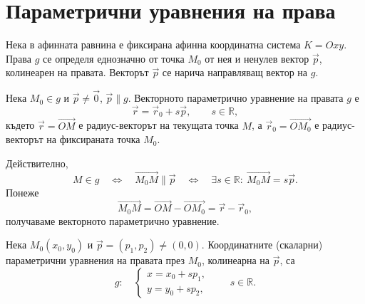 \begin{konspekt}
\end{konspekt}

\section{Параметрични уравнения на права}\label{s:28.1}

Нека в афинната равнина е фиксирана афинна координатна система
$K=Oxy$. Права $g$ се определя еднозначно от точка $M_0$ от нея и
ненулев вектор $\vec p$, колинеарен на правата. Векторът $\vec p$ се
нарича направляващ вектор на $g$.

\begin{defn}
Нека $M_0\in g$ и $\vec p\neq\vec 0$, $\vec p\parallel g$. Векторното
параметрично уравнение на правата $g$ е
\[
 \vec r=\vec r_0+s\vec p,\qquad s\in\mathbb R,
\]
където $\vec r=\overrightarrow{OM}$ е радиус-векторът на текущата точка
$M$, а $\vec r_0=\overrightarrow{OM_0}$ е радиус-векторът на фиксираната
точка $M_0$.
\end{defn}

Действително,
\[
 M\in g
 \quad\Longleftrightarrow\quad
 \overrightarrow{M_0M}\parallel\vec p
 \quad\Longleftrightarrow\quad
 \exists s\in\mathbb R:\ \overrightarrow{M_0M}=s\vec p.
\]
Понеже
\[
 \overrightarrow{M_0M}
 =\overrightarrow{OM}-\overrightarrow{OM_0}
 =\vec r-\vec r_0,
\]
получаваме векторното параметрично уравнение.

\begin{defn}
Нека $M_0(x_0,y_0)$ и $\vec p=(p_1,p_2)\neq(0,0)$. Координатните
(скаларни) параметрични уравнения на правата през $M_0$, колинеарна на
$\vec p$, са
\[
 g:\quad
 \begin{cases}
 x=x_0+sp_1,\\
 y=y_0+sp_2,
 \end{cases}
 \qquad s\in\mathbb R.
\]
\end{defn}

